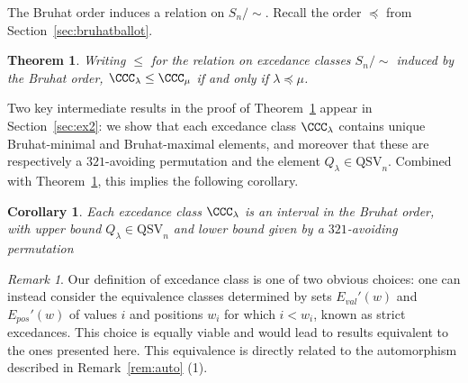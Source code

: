 \documentclass[submission]{FPSAC2024}
\newtheorem{thm}[equation]{Theorem}
\newtheorem{cor}[equation]{Corollary}
\theoremstyle{definition}
\theoremstyle{remark}
\newtheorem{rem}[equation]{Remark}
\numberwithin{equation}{section}
\newcommand{\QSV}{\mathrm{QSV}}
\newcommand{\EP}{E_{pos}}
\newcommand{\EV}{E_{val}}
\begin{document}
The Bruhat order induces a relation on $S_{n}\big/\!\!\sim$.
Recall the order $\preceq$ from Section~\ref{sec:bruhatballot}.

\begin{thm}
\label{thm:excedancequotient}
Writing $\le$ for the relation on excedance classes $S_{n}\big/\!\! \sim$ induced by the Bruhat order, $\CCC_{\lambda} \le \CCC_{\mu}$ if and only if $\lambda \preceq \mu$.
\end{thm}

Two key intermediate results in the proof of Theorem~\ref{thm:excedancequotient} appear in Section~\ref{sec:ex2}: we show that each excedance class $\CCC_{\lambda}$ contains unique Bruhat-minimal and Bruhat-maximal elements, and moreover that these are respectively a $321$-avoiding permutation and the element $Q_{\lambda} \in \QSV_{n}$.  Combined with Theorem~\ref{thm:excedancequotient}, this implies the following corollary.  

\begin{cor}\label{cor:interval}
Each excedance class $\CCC_{\lambda}$ is an interval in the Bruhat order, with upper bound $Q_{\lambda}\in \QSV_n$ and lower bound given by a $321$-avoiding permutation
\end{cor}



\begin{rem}
\label{rem:altECs}
 Our definition of excedance class is one of two obvious choices: one can instead consider the equivalence classes determined by sets $\EV'(w)$ and $\EP'(w)$ of values $i$ and positions $w_{i}$ for which $i < w_{i}$, known as strict excedances.  
This choice is equally viable and would lead to results equivalent to the ones presented here.  This equivalence is directly  related to the automorphism described in Remark~\ref{rem:auto} (1).

%
\end{rem}
\end{document}
